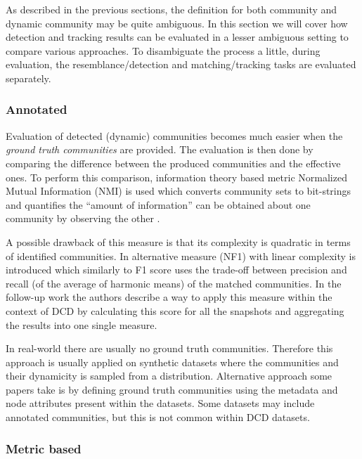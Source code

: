\documentclass[
acmsmall,
nonacm,
screen,
acmthm]{../../scripts/pandoc/templates/acmart}
\begin{document}
As described in the previous sections, the definition for both community
and dynamic community may be quite ambiguous. In this section we will
cover how detection and tracking results can be evaluated in a lesser
ambiguous setting to compare various approaches. To disambiguate the
process a little, during evaluation, the resemblance/detection and
matching/tracking tasks are evaluated separately.

\hypertarget{annotated}{%
\subsubsection{Annotated}\label{annotated}}

Evaluation of detected (dynamic) communities becomes much easier when
the \emph{ground truth communities} are provided. The evaluation is then
done by comparing the difference between the produced communities and
the effective ones. To perform this comparison, information theory based
metric Normalized Mutual Information (NMI) is used which converts
community sets to bit-strings and quantifies the ``amount of
information'' can be obtained about one community by observing the other
\citep{lancichinettiDetectingOverlappingHierarchical2009}.

A possible drawback of this measure is that its complexity is quadratic
in terms of identified communities. In
\citep{rossettiNovelApproachEvaluate2016} alternative measure (NF1) with
linear complexity is introduced which similarly to F1 score uses the
trade-off between precision and recall (of the average of harmonic
means) of the matched communities. In the follow-up work
\citep{rossettiANGELEfficientEffective2020} the authors describe a way
to apply this measure within the context of DCD by calculating this
score for all the snapshots and aggregating the results into one single
measure.

In real-world there are usually no ground truth communities. Therefore
this approach is usually applied on synthetic datasets where the
communities and their dynamicity is sampled from a distribution.
Alternative approach some papers take is by defining ground truth
communities using the metadata and node attributes present within the
datasets. Some datasets may include annotated communities, but this is
not common within DCD datasets.

\hypertarget{metric-based}{%
\subsubsection{Metric based}\label{metric-based}}
\end{document}
